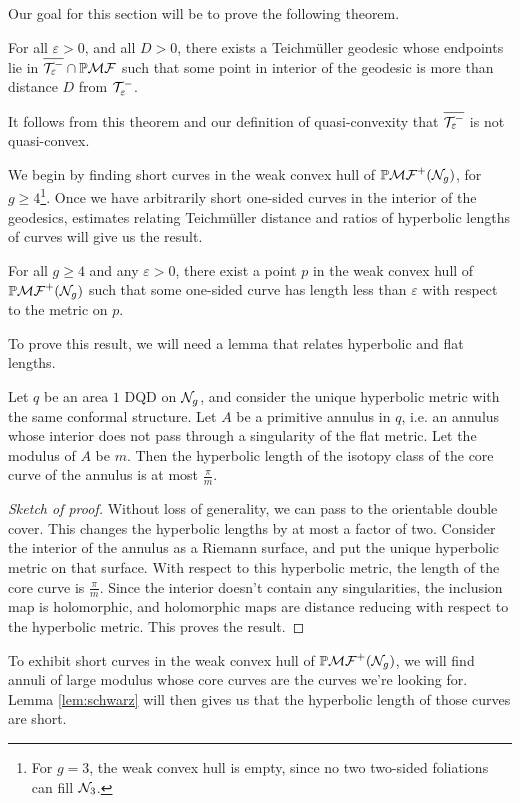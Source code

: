\documentclass[12pt, reqno]{amsart}
\begin{document}
Our goal for this section will be to prove the following theorem.
\begin{theorem}
  \label{thm:qc-fail}
  For all $\varepsilon > 0$, and all $D > 0$, there exists a Teichm\"uller geodesic whose endpoints lie in $\overline{\mathcal{T}_{\varepsilon}^{-}} \cap \mathbb{P}\mathcal{MF}$ such that some point in interior of the geodesic is more than distance $D$ from $\mathcal{T}_{\varepsilon}^{-}$.
\end{theorem}
It follows from this theorem and our definition of quasi-convexity that $\overline{\mathcal{T}_{\varepsilon}^{-}}$ is not quasi-convex.

We begin by finding short curves in the weak convex hull of $\mathbb{P}\mathcal{MF}^+(\mathcal{N}_g)$, for $g \geq 4$\footnote{For $g = 3$, the weak convex hull is empty, since no two two-sided foliations can fill $\mathcal{N}_3$.}.
Once we have arbitrarily short one-sided curves in the interior of the geodesics, estimates relating Teichmüller distance and ratios of hyperbolic lengths of curves will give us the result.
\begin{proposition}
  \label{prop:very-short-curves}
  For all $g \geq 4$ and any $\varepsilon > 0$, there exist a point $p$ in the weak convex hull of $\mathbb{P}\mathcal{MF}^+(\mathcal{N}_g)$ such that some one-sided curve has length less than $\varepsilon$ with respect to the metric on $p$.
\end{proposition}

To prove this result, we will need a lemma that relates hyperbolic and flat lengths.
\begin{lemma}
  \label{lem:schwarz}
  Let $q$ be an area $1$ DQD on $\mathcal{N}_g$, and consider the unique hyperbolic metric with the same conformal structure.
  Let $A$ be a primitive annulus in $q$, i.e. an annulus whose interior does not pass  through a singularity of the flat metric.
  Let the modulus of $A$ be $m$.
  Then the hyperbolic length of the isotopy class of the core curve of the annulus is at most $\frac{\pi}{m}$.
\end{lemma}
\begin{proof}[Sketch of proof]
  Without loss of generality, we can pass to the orientable double cover.
  This changes the hyperbolic lengths by at most a factor of two.
  Consider the interior of the annulus as a Riemann surface, and put the unique hyperbolic metric on that surface.
  With respect to this hyperbolic metric, the length of the core curve is $\frac{\pi}{m}$. Since the interior doesn't contain any singularities, the inclusion map is holomorphic, and holomorphic maps are distance reducing with respect to the hyperbolic metric.
  This proves the result.
\end{proof}
To exhibit short curves in the weak convex hull of $\mathbb{P}\mathcal{MF}^+(\mathcal{N}_g)$, we will find annuli of large modulus whose core curves are the curves we're looking for.
Lemma \ref{lem:schwarz} will then gives us that the hyperbolic length of those curves are short.
\end{document}
